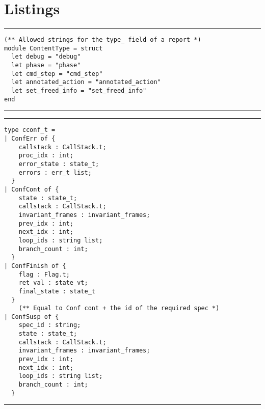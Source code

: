 
\appendix
\chapter{Listings}

\noindent\rule{\textwidth}{0.5pt}
\vspace{-0.6cm}
\begin{verbatim}
(** Allowed strings for the type_ field of a report *)
module ContentType = struct
  let debug = "debug"
  let phase = "phase"
  let cmd_step = "cmd_step"
  let annotated_action = "annotated_action"
  let set_freed_info = "set_freed_info"
end
\end{verbatim}
\vspace{-0.4cm}
\noindent\rule{\textwidth}{0.5pt}
\vspace{-0.6cm}
%
\label{lst:loggingconstants}

\vspace{2em}
\noindent\rule{\textwidth}{0.5pt}
\vspace{-0.6cm}
\begin{verbatim}
type cconf_t =
| ConfErr of {
    callstack : CallStack.t;
    proc_idx : int;
    error_state : state_t;
    errors : err_t list;
  }
| ConfCont of {
    state : state_t;
    callstack : CallStack.t;
    invariant_frames : invariant_frames;
    prev_idx : int;
    next_idx : int;
    loop_ids : string list;
    branch_count : int;
  }
| ConfFinish of {
    flag : Flag.t;
    ret_val : state_vt;
    final_state : state_t
  }
    (** Equal to Conf cont + the id of the required spec *)
| ConfSusp of {
    spec_id : string;
    state : state_t;
    callstack : CallStack.t;
    invariant_frames : invariant_frames;
    prev_idx : int;
    next_idx : int;
    loop_ids : string list;
    branch_count : int;
  }
\end{verbatim}
\vspace{-0.4cm}
\noindent\rule{\textwidth}{0.5pt}
\vspace{-0.6cm}
\label{lst:cconf-type}

